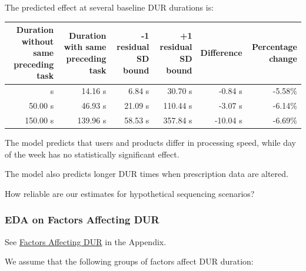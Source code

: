 \documentclass[
]{article}
\newcounter{none} %
\begin{document}
The predicted effect at several baseline DUR durations is:

{\def\LTcaptype{none} %
\begin{longtable}[]{@{}rrrrrr@{}}
\toprule\noalign{}
Duration without same preceding task & Duration with same preceding task
& -1 residual SD bound & +1 residual SD bound & Difference & Percentage
change \\
\midrule\noalign{}
\endhead
\bottomrule\noalign{}
\endlastfoot
15.00 s & 14.16 s & 6.84 s & 30.70 s & -0.84 s & -5.58\% \\
50.00 s & 46.93 s & 21.09 s & 110.44 s & -3.07 s & -6.14\% \\
150.00 s & 139.96 s & 58.53 s & 357.84 s & -10.04 s & -6.69\% \\
\end{longtable}
}

The model predicts that users and products differ in processing speed,
while day of the week has no statistically significant effect.

The model also predicts longer DUR times when prescription data are
altered.

How reliable are our estimates for hypothetical sequencing scenarios?

\subsubsection{EDA on Factors Affecting
DUR}\label{eda-on-factors-affecting-dur}

See \hyperref[factors-affecting-successful-durs]{Factors Affecting DUR}
in the Appendix.

We assume that the following groups of factors affect DUR duration:
\end{document}
